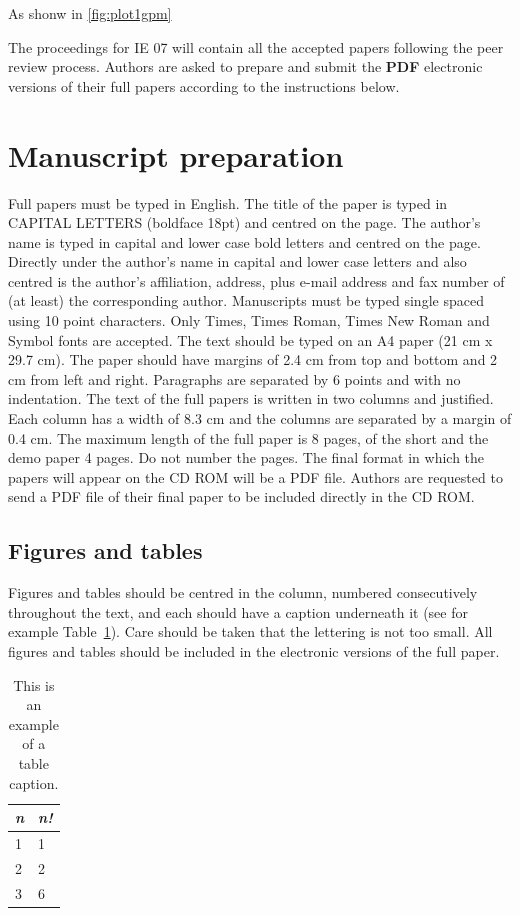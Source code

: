 \documentclass{article}\usepackage{graphicx, color}
\begin{document}
As shonw in \autoref{fig:plot1gpm}

The proceedings for IE 07 will contain all the accepted
papers following the peer review process. Authors are
asked to prepare and submit the {\bf PDF} electronic versions
of their full papers according to the instructions below.

\section{Manuscript preparation}
Full papers must be typed in English. The title of the
paper is typed in CAPITAL LETTERS (boldface 18pt)
and centred on the page. The author's name is typed in
capital and lower case bold letters and centred on the
page. Directly under the author's name in capital and
lower case letters and also centred is the author's
affiliation, address, plus e-mail address and fax number of
(at least) the corresponding author. Manuscripts must be
typed single spaced using 10 point characters. Only
Times, Times Roman, Times New Roman and Symbol
fonts are accepted. The text should be typed on an A4
paper (21 cm x 29.7 cm). The paper should have margins
of 2.4 cm from top and bottom and 2 cm from left and
right. Paragraphs are separated by 6 points and with no
indentation. The text of the full papers is written in two
columns and justified. Each column has a width of 8.3 cm
and the columns are separated by a margin of 0.4 cm. The
maximum length of the full paper is 8 pages, of the short
and the demo paper 4 pages. Do not number the pages.
The final format in which the papers will appear on the
CD ROM will be a PDF file. Authors are requested to send
a PDF file of their final paper to be included directly
in the CD ROM.

\subsection{Figures and tables}
Figures and tables should be centred in the column,
numbered consecutively throughout the text, and each
should have a caption underneath it (see for example
Table~\ref{tab1}). Care should be taken that the lettering
is not too small. All figures and tables should be included
in the electronic versions of the full paper.


\begin{table}[htb!]
\begin{center}

\begin{tabular}{|l|l|}
\hline
{\em n} & {\em n!} \\
\hline
1 & 1  \\
2 & 2  \\
3  & 6\\
\hline
\end{tabular}
\end{center}
\caption{\label{tab1}This is an example of a table caption.}
\end{table}
\end{document}

